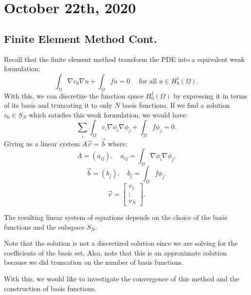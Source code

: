 \documentclass[../main/main.tex]{subfiles}
\begin{document}
\section{October 22th, 2020}
\subsection{Finite Element Method Cont.}
Recall that the finite element method transform the PDE into a equivalent weak formulation: \[
    \int_{\Omega} \nabla v_0 \nabla u + \int_\Omega fu = 0 \quad \text{ for all $u \in H^1_0(\Omega)$}
.\] 
With this, we can discretize the function space $H^1_0(\Omega)$ by expressing it in terms of its basis and truncating it to only $N$ basis functions. If we find a solution $ v_0\in S_N$ which satisfies this weak formulation, we would have: 
\[
\sum_{i}\int_\Omega v_i\nabla \phi_i \nabla \phi_j + \int_\Omega f \phi_j = 0
.\] Giving us a linear system $A\vec{v} = \vec{b}$ where: \[
A = (a_{ij}), \quad a_{ij} = \int_{\Omega} \nabla \phi_i\nabla \phi_j
.\] \[
\vec{b} = (b_j), \quad b_j = \int_{\Omega} f \phi_j
.\] \[
\vec{v} = \begin{bmatrix} v_1\\\vdots\\v_N \end{bmatrix} 
.\]
\begin{remark}
    The resulting linear system of equations depends on the choice of the basis functions and the subspace $S_N$. 
\end{remark}
\begin{remark}
    Note that the solution is not a discretized solution since we are solving for the coefficients of the basis set. Also, note that this is an approximate solution because we did truncation on the number of basis functions.
\end{remark}
With this, we would like to investigate the convergence of this method and the construction of basis functions. \\
\end{document}
